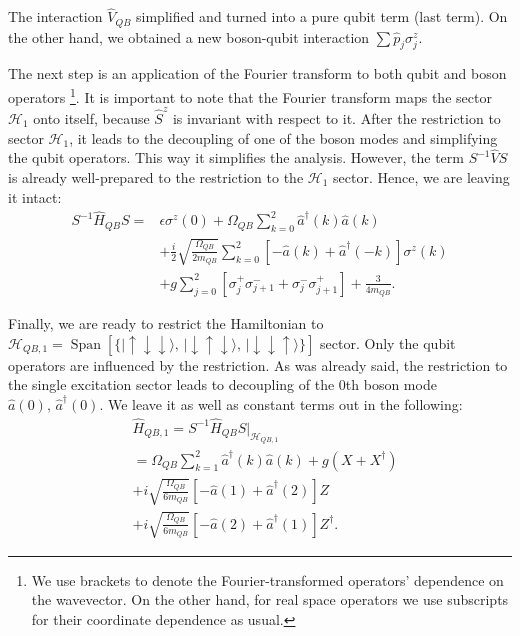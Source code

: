 \documentclass[reprint, aps, prx, amsmath, amssymb, longbibliography, superscriptaddress]{revtex4-2}
\begin{document}
The interaction $\hat V_{QB}$ simplified and turned into a pure qubit term (last term). On the other hand, we obtained a new boson-qubit interaction $ \sum \hat p_j \sigma_j^z $. 

The next step is an application of the Fourier transform to both qubit and boson operators \footnote{We use brackets to denote the Fourier-transformed operators' dependence on the wavevector. On the other hand, for real space operators we use subscripts for their coordinate dependence as usual.}. It is important to note that the Fourier transform maps the sector $\mathcal{H}_1$ onto itself, because $\hat S^z$ is invariant with respect to it. After the restriction to sector $\mathcal{H}_1$, it leads to the decoupling of one of the boson modes and simplifying the qubit operators. This way it simplifies the analysis. However, the term $S^{-1} \hat V S $ is already well-prepared to the restriction to the $\mathcal{H}_1$ sector. Hence, we are leaving it intact:
\begin{equation}
\begin{aligned}
    S^{-1} \hat H_{QB} S = &\epsilon \sigma^z(0) + \Omega_{QB} \sum\limits_{k=0}^{2} \hat a^{\dagger}(k) \hat a(k) \\
    &+ \frac{i}{2}\sqrt{\frac{\Omega_{QB}}{2m_{QB}}} \sum\limits_{k = 0}^{2} \left[-\hat a(k) + \hat a^{\dagger}(-k)\right] \sigma^z(k) \\
    &+ g \sum\limits_{j=0}^2 \left[\sigma_{j}^+ \sigma_{j+1}^- + \sigma_{j}^- \sigma_{j+1}^+\right] + \frac{3}{4 m_{QB}}.
\end{aligned}
\end{equation}

Finally, we are ready to restrict the Hamiltonian to $\mathcal{H}_{QB,1} = \operatorname{Span}[\{|\uparrow\downarrow\downarrow\rangle, \, |\downarrow\uparrow\downarrow\rangle, \,|\downarrow\downarrow\uparrow\rangle\}] $ sector. Only the qubit operators are influenced by the restriction. As was already said, the restriction to the single excitation sector leads to decoupling of the $0$th boson mode $\hat a(0), \, \hat a^{\dagger}(0)$. We leave it as well as constant terms out in the following:
\begin{equation}
\begin{aligned}
    &\hat H_{QB,1} = S^{-1}  \hat H_{QB} S \big|_{\mathcal{H}_{QB,1}} \\
    &= \Omega_{QB} \sum\limits_{k=1}^2 \hat a^{\dagger}(k) \hat a(k)  + g (X + X^{\dagger}) \\
    &+i\sqrt{\frac{\Omega_{QB}}{6m_{QB}}} \left[-\hat a(1) + \hat a^{\dagger}(2)\right] Z \\
    &+i\sqrt{\frac{\Omega_{QB}}{6m_{QB}}} \left[-\hat a(2) + \hat a^{\dagger}(1)\right] Z^{\dagger}.
\end{aligned}
\end{equation}
\end{document}

